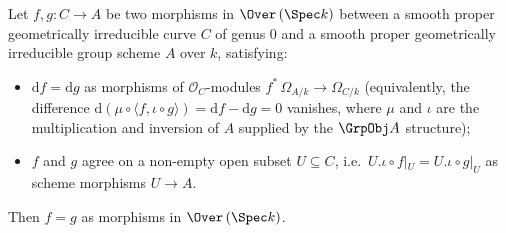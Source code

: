 \begin{theorem}\leanok
[(ii-scheme-lift) Scheme-level \(\mathrm df = 0\) implies \(f\) factors through \(\Spec k\)]
  \label{lem:Scheme_Over_ext_of_diff_zero}
  
  Let \(f, g \colon C \to A\) be two morphisms in \(\Over\,(\Spec k)\) between a smooth proper geometrically irreducible curve \(C\) of genus \(0\) and a smooth proper geometrically irreducible group scheme \(A\) over \(k\), satisfying:
  \begin{itemize}
    \item \(\mathrm df = \mathrm dg\) as morphisms of \(\mathcal O_C\)-modules \(f^{*}\,\Omega_{A/k} \to \Omega_{C/k}\) (equivalently, the difference \(\mathrm d(\mu \circ \langle f, \iota \circ g \rangle) = \mathrm df - \mathrm dg = 0\) vanishes, where \(\mu\) and \(\iota\) are the multiplication and inversion of \(A\) supplied by the \(\GrpObj A\) structure);
    \item \(f\) and \(g\) agree on a non-empty open subset \(U \subseteq C\), i.e.\ \(U.\iota \circ f|_{U} = U.\iota \circ g|_{U}\) as scheme morphisms \(U \to A\).
  \end{itemize}
  Then \(f = g\) as morphisms in \(\Over\,(\Spec k)\).


\end{theorem}
